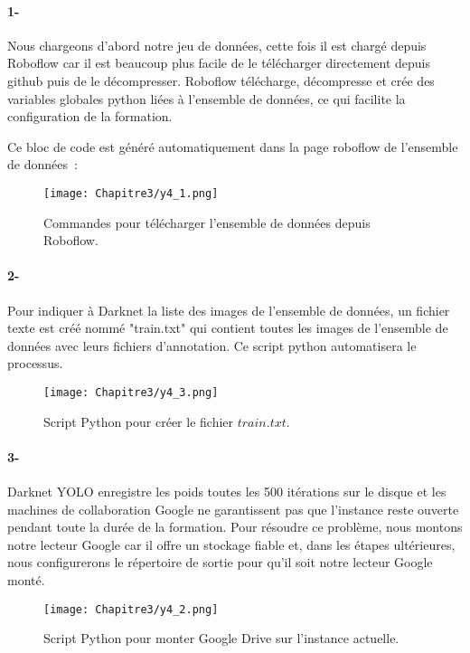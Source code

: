      \paragraph{1-} Nous chargeons d'abord notre jeu de données, cette fois il est chargé depuis Roboflow car il est beaucoup plus facile de le télécharger directement depuis github puis de le décompresser. Roboflow télécharge, décompresse et crée des variables globales python liées à l'ensemble de données, ce qui facilite la configuration de la formation.

     Ce bloc de code est généré automatiquement dans la page roboflow de l'ensemble de données :
     \begin{figure}[H]
               \centering
               \texttt{[image: Chapitre3/y4\_1.png]}
               \caption{Commandes pour télécharger l'ensemble de données depuis Roboflow.}
               \label{y4_1}
               \end{figure}
     
     \paragraph{2-} Pour indiquer à Darknet la liste des images de l'ensemble de données, un fichier texte est créé nommé "train.txt" qui contient toutes les images de l'ensemble de données avec leurs fichiers d'annotation. Ce script python automatisera le processus.
     \begin{figure}[H]
               \centering
               \texttt{[image: Chapitre3/y4\_3.png]}
               \caption{Script Python pour créer le fichier \(train.txt\).}
               \label{y4_2}
               \end{figure}

     \paragraph{3-} Darknet YOLO enregistre les poids toutes les 500 itérations sur le disque et les machines de collaboration Google ne garantissent pas que l'instance reste ouverte pendant toute la durée de la formation. Pour résoudre ce problème, nous montons notre lecteur Google car il offre un stockage fiable et, dans les étapes ultérieures, nous configurerons le répertoire de sortie pour qu'il soit notre lecteur Google monté.
     \begin{figure}[H]
               \centering
               \texttt{[image: Chapitre3/y4\_2.png]}
               \caption{Script Python pour monter Google Drive sur l'instance actuelle.}
               \label{y4_3}
               \end{figure}


